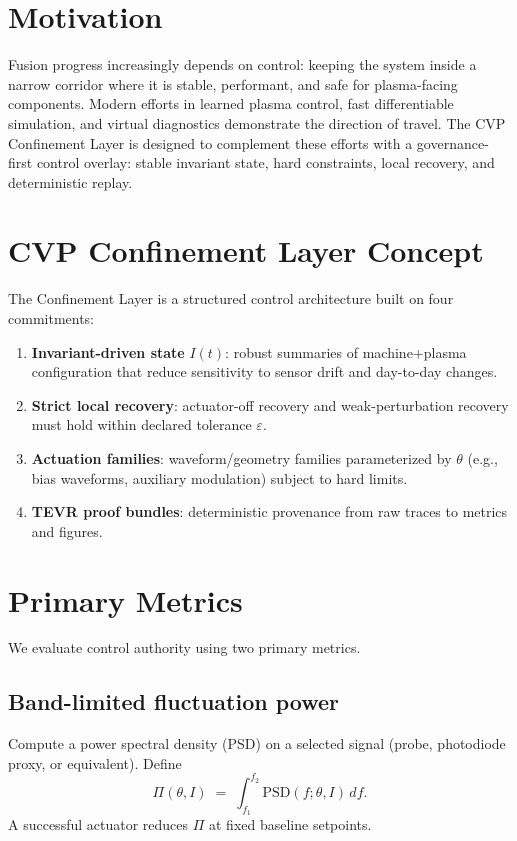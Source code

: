 \documentclass[conference]{IEEEtran}
\newcommand{\PiBand}{\Pi}
\begin{document}
\section{Motivation}
Fusion progress increasingly depends on control: keeping the system inside a narrow corridor where it is stable, performant, and safe for plasma-facing components.
Modern efforts in learned plasma control, fast differentiable simulation, and virtual diagnostics demonstrate the direction of travel.
The CVP Confinement Layer is designed to complement these efforts with a governance-first control overlay: stable invariant state, hard constraints, local recovery, and deterministic replay.

\section{CVP Confinement Layer Concept}
The Confinement Layer is a structured control architecture built on four commitments:
\begin{enumerate}
\item \textbf{Invariant-driven state} $I(t)$: robust summaries of machine+plasma configuration that reduce sensitivity to sensor drift and day-to-day changes.
\item \textbf{Strict local recovery}: actuator-off recovery and weak-perturbation recovery must hold within declared tolerance $\varepsilon$.
\item \textbf{Actuation families}: waveform/geometry families parameterized by $\theta$ (e.g., bias waveforms, auxiliary modulation) subject to hard limits.
\item \textbf{TEVR proof bundles}: deterministic provenance from raw traces to metrics and figures.
\end{enumerate}

\section{Primary Metrics}
We evaluate control authority using two primary metrics.
\subsection{Band-limited fluctuation power}
Compute a power spectral density (PSD) on a selected signal (probe, photodiode proxy, or equivalent). Define
\begin{equation}
\PiBand(\theta, I) \;=\; \int_{f_1}^{f_2} \mathrm{PSD}\!\left(f; \theta, I\right)\, df.
\end{equation}
A successful actuator reduces $\PiBand$ at fixed baseline setpoints.
\end{document}
